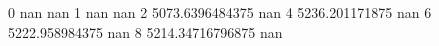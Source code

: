 0 nan nan
1 nan nan
2 5073.6396484375 nan
4 5236.201171875 nan
6 5222.958984375 nan
8 5214.34716796875 nan

